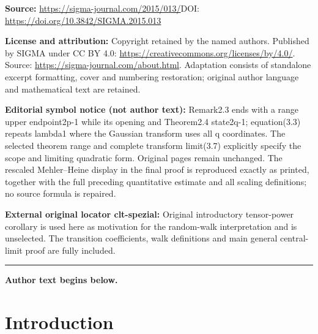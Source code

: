\documentclass[11pt]{article}
\numberwithin{equation}{section}
\begin{document}
\noindent\textbf{Source:} \url{https://sigma-journal.com/2015/013/}\quad DOI: \url{https://doi.org/10.3842/SIGMA.2015.013}\par
\noindent\textbf{License and attribution:} Copyright retained by the named authors. Published by SIGMA under CC BY 4.0: \url{https://creativecommons.org/licenses/by/4.0/}. Source: \url{https://sigma-journal.com/about.html}. Adaptation consists of standalone excerpt formatting, cover and numbering restoration; original author language and mathematical text are retained.\par
\noindent\textbf{Editorial symbol notice (not author text):} Remark2.3 ends with a range upper endpoint2p-1 while its opening and Theorem2.4 state2q-1; equation(3.3) repeats lambda1 where the Gaussian transform uses all q coordinates. The selected theorem range and complete transform limit(3.7) explicitly specify the scope and limiting quadratic form. Original pages remain unchanged. The rescaled Mehler–Heine display in the final proof is reproduced exactly as printed, together with the full preceding quantitative estimate and all scaling definitions; no source formula is repaired.\par
\noindent\textbf{External original locator clt-spezial:} Original introductory tensor-power corollary is used here as motivation for the random-walk interpretation and is unselected. The transition coefficients, walk definitions and main general central-limit proof are fully included.\par
\medskip\hrule\medskip\noindent\textbf{Author text begins below.}\par
\setcounter{section}{0}
\setcounter{subsection}{0}
\setcounter{subsubsection}{0}
\setcounter{Theorem}{0}
\setcounter{equation}{0}
\section{Introduction}
\end{document}
